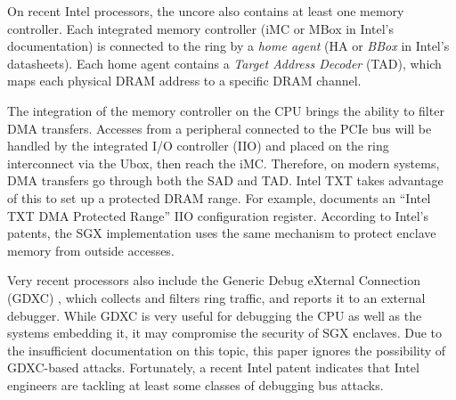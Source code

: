 On recent Intel processors, the uncore also contains at least one memory
controller. Each integrated memory controller (iMC or MBox in Intel's
documentation) is connected to the ring by a \textit{home agent} (HA or
\textit{BBox} in Intel's datasheets). Each home agent contains a
\textit{Target Address Decoder} (TAD), which maps each physical DRAM address to
a specific DRAM channel.

The integration of the memory controller on the CPU brings the ability to
filter DMA transfers. Accesses from a peripheral connected to the PCIe bus will
be handled by the integrated I/O controller (IIO) and placed on the ring
interconnect via the Ubox, then reach the iMC. Therefore, on modern systems,
DMA transfers go through both the SAD and TAD. Intel TXT takes advantage of
this to set up a protected DRAM range. For example, \cite{intel2015datasheet}
documents an ``Intel TXT DMA Protected Range'' IIO configuration register.
According to Intel's patents, the SGX implementation uses the same mechanism to
protect enclave memory from outside accesses.

Very recent processors also include the Generic Debug eXternal Connection
(GDXC) \cite{yuffe2011sandybridge, intel2011gdxc}, which collects and filters
ring traffic, and reports it to an external debugger. While GDXC is very useful
for debugging the CPU as well as the systems embedding it, it may compromise
the security of SGX enclaves. Due to the insufficient documentation on this
topic, this paper ignores the possibility of GDXC-based attacks. Fortunately,
a recent Intel patent \cite{shanbhogue2015gdxcsgx} indicates that Intel
engineers are tackling at least some classes of debugging bus attacks.
